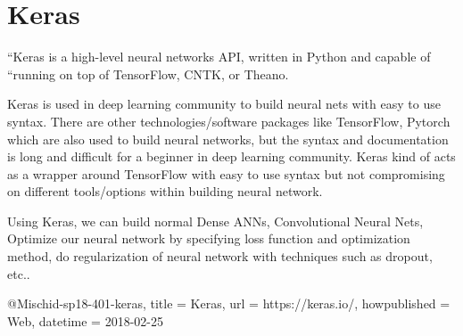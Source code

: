 \section{Keras} 

“Keras is a high-level neural networks API, written in Python and capable of
“running on top of TensorFlow, CNTK, or Theano.~\cite{hid-sp18-401-keras}

Keras is used in deep learning community to build neural nets with easy to use
syntax. There are other technologies/software packages like TensorFlow, Pytorch
which are also used to build neural networks, but the syntax and documentation
is long and difficult for a beginner in deep learning community. Keras kind of
acts as a wrapper around TensorFlow with easy to use syntax but not compromising
on different tools/options within building neural network.

Using Keras, we can build normal Dense ANNs, Convolutional Neural Nets, Optimize
our neural network by specifying loss function and optimization method, do
regularization of neural network with techniques such as dropout, etc..


@Misc{hid-sp18-401-keras,
title = {Keras},
url = {https://keras.io/},
howpublished = {Web},
datetime = {2018-02-25}
}

